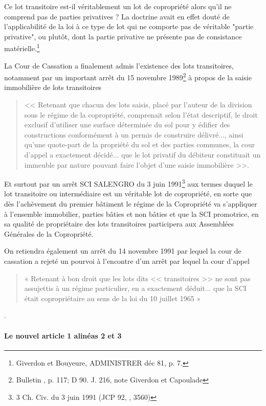 				Ce lot transitoire est-il véritablement un lot de copropriété alors qu'il ne comprend pas de parties privatives ? La doctrine avait en effet douté de l'applicabilité de la loi à ce type de lot qui ne comporte pas de véritable "partie privative", ou plutôt, dont la partie privative ne présente pas de consistance matérielle.\footnote{Giverdon et Bouyeure, ADMINISTRER déc 81, p. 7.}
				
				La Cour de Cassation a finalement admis l’existence des lots transitoires, notamment par un important arrêt du 15 novembre 1989\footnote{Bulletin , p. 117; D 90. J. 216, note Giverdon et Capoulade} à propos de la saisie immobilière de lots transitoires
				\begin{quote}
					<< Retenant que chacun des lots saisis, placé par l'auteur de la division sous le régime de la copropriété, comprenait selon l'état descriptif, le droit exclusif d'utiliser une surface déterminée du sol pour y édifier des constructions conformément à un permis de construire délivré..., ainsi qu'une quote-part de la propriété du sol et des parties communes, la cour d'appel a exactement décidé... que le lot privatif du débiteur constituait un immeuble par nature pouvant faire l'objet d'une saisie immobilière >>.
				\end{quote}
				Et surtout par un arrêt SCI SALENGRO du 3 juin 1991\footnote{3\degre{} Ch. Civ. du 3 juin 1991 (JCP 92, \I{}, 3560)} aux termes duquel le lot transitoire ou intermédiaire est un véritable lot de copropriété, en sorte que dès l'achèvement du premier bâtiment le régime de la Copropriété va s'appliquer à l'ensemble immobilier, parties bâties et non bâties et que la SCI promotrice, en sa qualité de propriétaire des lots transitoires participera aux Assemblées Générales de la Copropriété.
				
				On retiendra également un arrêt du 14 novembre 1991 par lequel la cour de cassation a rejeté un pourvoi à l'encontre d'un arrêt par lequel la cour d'appel
				\begin{quote}
					« Retenant à bon droit que les lots dits << transitoires >> ne sont pas assujettis à un régime particulier, en a exactement déduit$\dots$ que la SCI était copropriétaire au sens de la loi du 10 juillet 1965 »
				\end{quote}.
	
			\paragraph{Le nouvel article 1\ier{} alinéas 2 et 3} 

